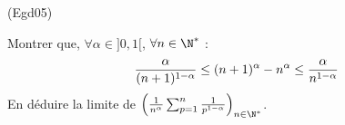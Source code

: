 \begin{tiny}(Egd05)\end{tiny}
Montrer que, $\forall \alpha \in ] 0,1[ $, $\forall n\in
\N^{*}$ :
\[
\frac{\alpha }{(n+1)^{1-\alpha }}\leq (n+1)^{\alpha }-n^{\alpha }\leq \frac{%
\alpha }{n^{1-\alpha }}
\]
En d{\'e}duire la limite de $\left( \frac{1}{n^\alpha}\sum_{p=1}^{n}\frac{1}{p^{1-\alpha }}\right)_{n\in \N^*}$.
